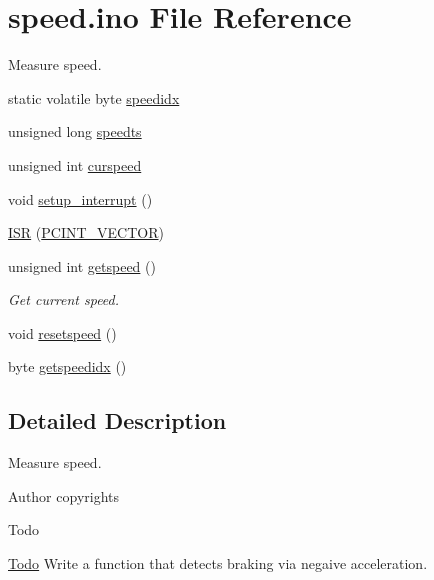 \hypertarget{speed_8ino}{}\section{speed.\+ino File Reference}
\label{speed_8ino}


Measure speed.  


\begin{DoxyCompactItemize}
\item 
static volatile byte \hyperlink{group__speed_gaded4e91dd554c212e6c75ef7148a7845}{speedidx}
\item 
unsigned long \hyperlink{group__speed_ga605bafc427aaa8e9718a112441ba88a7}{speedts}
\item 
unsigned int \hyperlink{group__speed_ga63232e097931bc02aa65b3b7dadbb74b}{curspeed}
\item 
void \hyperlink{group__speed_gae87a94769934715c309733cfdf2abcb4}{setup\+\_\+interrupt} ()
\item 
\hyperlink{group__speed_ga44395845abd4a9c31e4fbe88ed717fa3}{I\+SR} (\hyperlink{group__speed_ga77b45027297b1ff40b5b1249afb852e5}{P\+C\+I\+N\+T\+\_\+\+V\+E\+C\+T\+OR})
\item 
unsigned int \hyperlink{group__speed_gafc7b1718f9b23966dfed24056f67996f}{getspeed} ()
\begin{DoxyCompactList}\small\item\em Get current speed. \end{DoxyCompactList}\item 
void \hyperlink{group__speed_ga2004678343c1f7b145dc10aae949a4ec}{resetspeed} ()
\item 
byte \hyperlink{group__speed_gaa1b4f1cc5cf5ba94e3bc38f44e0c7001}{getspeedidx} ()
\end{DoxyCompactItemize}


\subsection{Detailed Description}
Measure speed. 

\begin{DoxyAuthor}{Author}
copyrights 
\end{DoxyAuthor}
\begin{DoxyRefDesc}{Todo}
\item[\hyperlink{todo__todo000005}{Todo}]Write a function that detects braking via negaive acceleration. \end{DoxyRefDesc}
